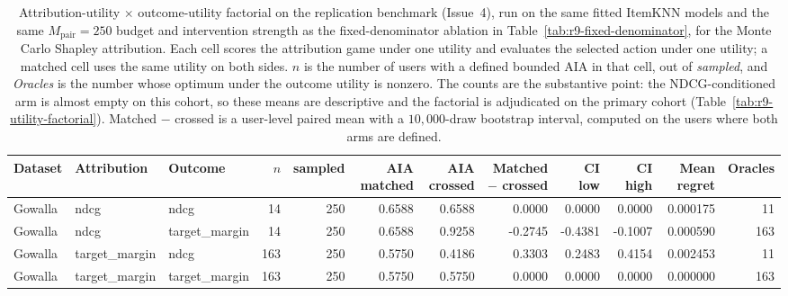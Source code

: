 \begin{table}[!htbp]\centering\scriptsize\setlength{\tabcolsep}{3pt}
\caption{Attribution-utility $\times$ outcome-utility factorial on the replication benchmark (Issue~4), run on the same fitted ItemKNN models and the same $M_{\mathrm{pair}}=250$ budget and intervention strength as the fixed-denominator ablation in Table~\ref{tab:r9-fixed-denominator}, for the Monte Carlo Shapley attribution. Each cell scores the attribution game under one utility and evaluates the selected action under one utility; a matched cell uses the same utility on both sides. $n$ is the number of users with a defined bounded AIA in that cell, out of \emph{sampled}, and \emph{Oracles} is the number whose optimum under the outcome utility is nonzero. The counts are the substantive point: the NDCG-conditioned arm is almost empty on this cohort, so these means are descriptive and the factorial is adjudicated on the primary cohort (Table~\ref{tab:r9-utility-factorial}). Matched $-$ crossed is a user-level paired mean with a $10{,}000$-draw bootstrap interval, computed on the users where both arms are defined.}
\label{tab:r9-utility-factorial-replication}
\begin{tabular}{@{}lllrrrrrrrrr@{}}
\toprule
Dataset & Attribution & Outcome & $n$ & sampled & AIA matched & AIA crossed & Matched $-$ crossed & CI low & CI high & Mean regret & Oracles \\
\midrule
Gowalla & ndcg & ndcg & 14 & 250 & 0.6588 & 0.6588 & 0.0000 & 0.0000 & 0.0000 & 0.000175 & 11 \\
Gowalla & ndcg & target_margin & 14 & 250 & 0.6588 & 0.9258 & -0.2745 & -0.4381 & -0.1007 & 0.000590 & 163 \\
Gowalla & target_margin & ndcg & 163 & 250 & 0.5750 & 0.4186 & 0.3303 & 0.2483 & 0.4154 & 0.002453 & 11 \\
Gowalla & target_margin & target_margin & 163 & 250 & 0.5750 & 0.5750 & 0.0000 & 0.0000 & 0.0000 & 0.000000 & 163 \\
\bottomrule
\end{tabular}
\end{table}


